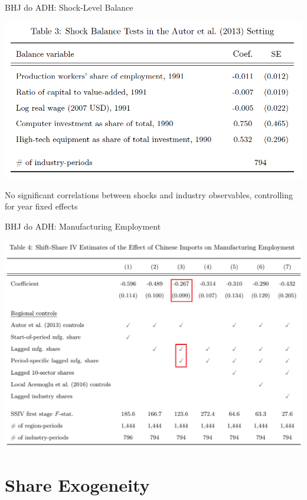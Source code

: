 \documentclass[t]{beamer}
\begin{document}
\begin{frame}{BHJ do ADH: Shock-Level Balance}
\begin{center}
\includegraphics[scale=0.6]{lecture_includes/adh_balance.png}
\end{center}

No significant correlations between shocks and industry observables, controlling for year fixed effects
\end{frame}

\begin{frame}{BHJ do ADH: Manufacturing Employment}
\begin{center}
\includegraphics[scale=0.4]{lecture_includes/adh_bhj.png}
\end{center}
\end{frame}

\section{Share Exogeneity}
\end{document}

